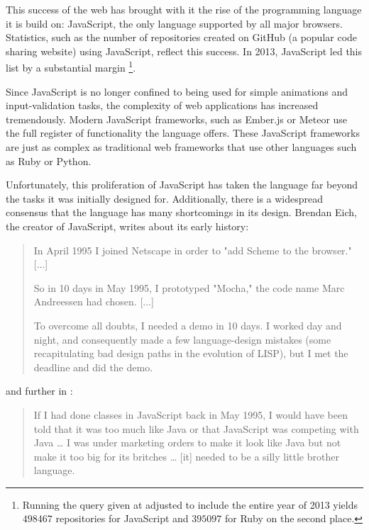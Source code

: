 \documentclass[11pt]{report}
\begin{document}
This success of the web has brought with it the rise of the programming language it is build on: JavaScript, the only language supported by all major browsers. Statistics, such as the number of repositories created on GitHub (a popular code sharing website) using JavaScript, reflect this success. In 2013, JavaScript led this list by a substantial margin \cite{githubarchive, topgithub}\footnote{Running the query given at \cite{topgithub} adjusted to include the entire year of 2013 yields $498467$ repositories for JavaScript and $395097$ for Ruby on the second place.}.

Since JavaScript is no longer confined to being used for simple animations and input-validation tasks, the complexity of web applications has increased tremendously. Modern JavaScript frameworks, such as Ember.js or Meteor use the full register of functionality the language offers. These JavaScript frameworks are just as complex as traditional web frameworks that use other languages such as Ruby or Python.

Unfortunately, this proliferation of JavaScript has taken the language far beyond the tasks it was initially designed for. Additionally, there is a widespread consensus that the language has many shortcomings in its design. Brendan Eich, the creator of JavaScript, writes \cite{books/daglib/0029097} about its early history:
\begin{quote}
In April 1995 I joined Netscape in order to "add Scheme to the browser." [...]

So in 10 days in May 1995, I prototyped "Mocha," the code name Marc Andreessen had chosen. [...]

To overcome all doubts, I needed a demo in 10 days. I worked day and night, and consequently made a few language-design mistakes (some recapitulating bad design paths in the evolution of LISP), but I met the deadline and did the demo.
\end{quote}

and further in \cite{10.1109/MC.2012.57}:

\begin{quote}
If I had done classes in JavaScript back in May 1995, I would have been told that it was too much like Java or that JavaScript was competing with Java … I was under marketing orders to make it look like Java but not make it too big for its britches … [it] needed to be a silly little brother language.
\end{quote}
\end{document}
